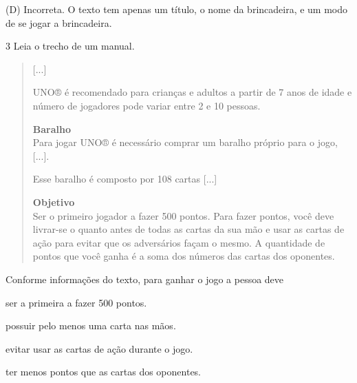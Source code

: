 \begin{escolha}
\begin{escolha}
(D) Incorreta. O texto tem apenas um título, o nome da brincadeira, e um
modo de se jogar a brincadeira.

\num{3} Leia o trecho de um manual.

\begin{quote}
{[}...{]}

UNO® é recomendado para crianças e adultos a partir de 7 anos de idade e número de jogadores pode variar entre 2 e 10 pessoas.

\textbf{Baralho}\\
Para jogar UNO® é necessário comprar um baralho próprio para o jogo,
{[}...{]}.

Esse baralho é composto por 108 cartas {[}...{]}

\textbf{Objetivo}\\
Ser o primeiro jogador a fazer 500 pontos. Para fazer pontos, você deve
livrar-se o quanto antes de todas as cartas da sua mão e usar as cartas de ação
para evitar que os adversários façam o mesmo. A quantidade de pontos que você
ganha é a soma dos números das cartas dos oponentes.
\end{quote}


Conforme informações do texto, para ganhar o jogo a pessoa deve

\begin{escolha}
\item ser a primeira a fazer 500 pontos.

\item possuir pelo menos uma carta nas mãos.

\item evitar usar as cartas de ação durante o jogo.

\item ter menos pontos que as cartas dos oponentes.
\end{escolha}



\end{escolha}
\end{escolha}
